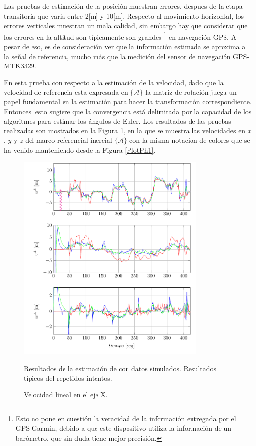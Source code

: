 \documentclass[conference]{IEEEtran}
\newcommand{\marco}[1]{\{\mathcal{#1}\}}
\begin{document}
Las pruebas de estimación de la posición muestran errores, despues de la etapa transitoria que varia entre 2[m] y 10[m]. Respecto al movimiento horizontal, los errores verticales muestran un mala calidad, sin embargo hay que considerar que los errores en la altitud son  típicamente son grandes \footnote{Esto no pone en cuestión la veracidad de la información entregada por el GPS-Garmin, debido a que este dispositivo utiliza la información de un barómetro, que sin duda tiene mejor precisión.} en navegación GPS. A pesar de eso, es de consideración ver que la información estimada se aproxima a la señal de referencia, mucho más que la medición del sensor de navegación GPS-MTK3329. \par
En esta prueba con respecto a la estimación de la velocidad, dado que la velocidad de referencia esta expresada en $\marco{A}$ la matriz de rotación juega un papel fundamental en la estimación para hacer la transformación correspondiente. Entonces, esto sugiere que la convergencia está delimitada por la capacidad de los algoritmos para estimar los ángulos de Euler. Los resultados de las pruebas realizadas son mostrados en la Figura \ref{PlotU1}, en la que se muestra las velocidades en $x$, $y$ y $z$ del marco referencial inercial $\marco{A}$ con la misma notación de colores que se ha venido manteniendo desde la Figura \ref{PlotPh1}.\par
\begin{figure}
\begin{center}
\includegraphics[width=25em]
{PlotVelocity1.pdf}
\caption{Velocidad lineal en el eje X.}
\scriptsize{Resultados de la estimación de con datos simulados. Resultados típicos del repetidos intentos.}
\label{PlotU1}
\end{center}
\end{figure}
\end{document}
